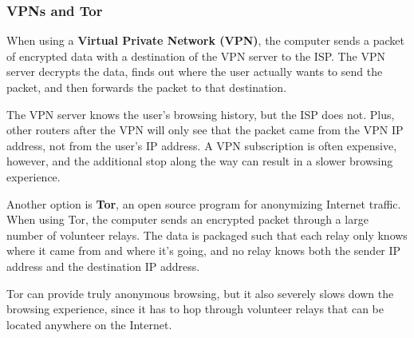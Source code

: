 \documentclass{article}
\begin{document}
  \subsubsection{VPNs and Tor}
  \begin{definition}
  When using a \textbf{Virtual Private Network (VPN)}, the computer sends a packet of encrypted data with a destination of the VPN server to the ISP. The VPN server decrypts the data, finds out where the user actually wants to send the packet, and then forwards the packet to that destination. 
  \begin{center}
  \end{center}
  The VPN server knows the user's browsing history, but the ISP does not. Plus, other routers after the VPN will only see that the packet came from the VPN IP address, not from the user's IP address. A VPN subscription is often expensive, however, and the additional stop along the way can result in a slower browsing experience. 
  \end{definition}

  Another option is \textbf{Tor}, an open source program for anonymizing Internet traffic.  When using Tor, the computer sends an encrypted packet through a large number of volunteer relays. The data is packaged such that each relay only knows where it came from and where it's going, and no relay knows both the sender IP address and the destination IP address. 
   
  Tor can provide truly anonymous browsing, but it also severely slows down the browsing experience, since it has to hop through volunteer relays that can be located anywhere on the Internet. 
\end{document}
